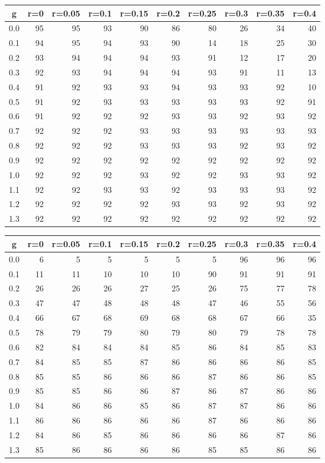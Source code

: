 %
\begin{table}[!tbp]
 \begin{center}
 \begin{tabular}{rrrrrrrrrr}\hline\hline
\multicolumn{1}{c}{g}&\multicolumn{1}{c}{r=0}&\multicolumn{1}{c}{r=0.05}&\multicolumn{1}{c}{r=0.1}&\multicolumn{1}{c}{r=0.15}&\multicolumn{1}{c}{r=0.2}&\multicolumn{1}{c}{r=0.25}&\multicolumn{1}{c}{r=0.3}&\multicolumn{1}{c}{r=0.35}&\multicolumn{1}{c}{r=0.4}\tabularnewline
\hline
0.0&95&95&93&90&86&80&26&34&40\tabularnewline
0.1&94&95&94&93&90&14&18&25&30\tabularnewline
0.2&93&94&94&94&93&91&12&17&20\tabularnewline
0.3&92&93&94&94&94&93&91&11&13\tabularnewline
0.4&91&92&93&93&94&93&93&92&10\tabularnewline
0.5&91&92&93&93&93&93&93&92&91\tabularnewline
0.6&91&92&92&92&93&93&92&93&92\tabularnewline
0.7&92&92&92&93&93&93&93&93&93\tabularnewline
0.8&92&92&92&93&93&93&92&93&92\tabularnewline
0.9&92&92&92&92&92&92&92&92&92\tabularnewline
1.0&92&92&92&93&92&92&93&93&92\tabularnewline
1.1&92&92&93&93&92&93&93&93&92\tabularnewline
1.2&92&92&92&92&93&93&92&93&92\tabularnewline
1.3&92&92&92&92&92&92&92&92&92\tabularnewline
\hline
\end{tabular}

\end{center}

\end{table}

%
\begin{table}[!tbp]
 \begin{center}
 \begin{tabular}{rrrrrrrrrr}\hline\hline
\multicolumn{1}{c}{g}&\multicolumn{1}{c}{r=0}&\multicolumn{1}{c}{r=0.05}&\multicolumn{1}{c}{r=0.1}&\multicolumn{1}{c}{r=0.15}&\multicolumn{1}{c}{r=0.2}&\multicolumn{1}{c}{r=0.25}&\multicolumn{1}{c}{r=0.3}&\multicolumn{1}{c}{r=0.35}&\multicolumn{1}{c}{r=0.4}\tabularnewline
\hline
0.0& 6& 5& 5& 5& 5& 5&96&96&96\tabularnewline
0.1&11&11&10&10&10&90&91&91&91\tabularnewline
0.2&26&26&26&27&25&26&75&77&78\tabularnewline
0.3&47&47&48&48&48&47&46&55&56\tabularnewline
0.4&66&67&68&69&68&68&67&66&35\tabularnewline
0.5&78&79&79&80&79&80&79&78&78\tabularnewline
0.6&82&84&84&84&85&86&84&85&83\tabularnewline
0.7&84&85&85&87&86&86&86&86&85\tabularnewline
0.8&85&85&86&86&86&87&86&86&85\tabularnewline
0.9&85&85&86&86&87&86&87&86&86\tabularnewline
1.0&84&86&86&85&86&87&87&86&86\tabularnewline
1.1&86&86&86&86&86&87&86&86&86\tabularnewline
1.2&84&86&85&86&86&86&86&87&86\tabularnewline
1.3&85&86&86&86&86&85&85&86&86\tabularnewline
\hline
\end{tabular}

\end{center}

\end{table}

